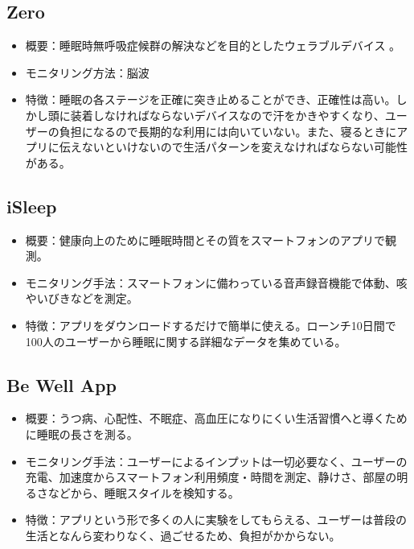 \subsection{Zero}
\begin{itemize}
\item 概要：睡眠時無呼吸症候群の解決などを目的としたウェラブルデバイス \cite{beWellApp}。
\item モニタリング方法：脳波
\item 特徴：睡眠の各ステージを正確に突き止めることができ、正確性は高い。しかし頭に装着しなければならないデバイスなので汗をかきやすくなり、ユーザーの負担になるので長期的な利用には向いていない。また、寝るときにアプリに伝えないといけないので生活パターンを変えなければならない可能性がある。
\end{itemize}

\subsection{iSleep}
\begin{itemize}
\item 概要：健康向上のために睡眠時間とその質をスマートフォンのアプリで観測。
\item モニタリング手法：スマートフォンに備わっている音声録音機能で体動、咳やいびきなどを測定。 \cite{iSleep}
\item 特徴：アプリをダウンロードするだけで簡単に使える。ローンチ10日間で100人のユーザーから睡眠に関する詳細なデータを集めている。
\end{itemize}

\subsection{Be Well App}
\begin{itemize}
\item 概要：うつ病、心配性、不眠症、高血圧になりにくい生活習慣へと導くために睡眠の長さを測る。
\item モニタリング手法：ユーザーによるインプットは一切必要なく、ユーザーの充電、加速度からスマートフォン利用頻度・時間を測定、静けさ、部屋の明るさなどから、睡眠スタイルを検知する。\cite{beWellApp}
\item 特徴：アプリという形で多くの人に実験をしてもらえる、ユーザーは普段の生活となんら変わりなく、過ごせるため、負担がかからない。
\end{itemize}

